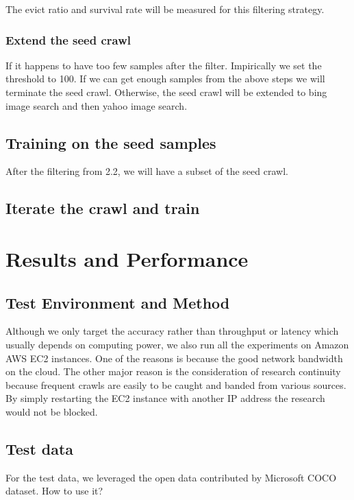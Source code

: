 \documentclass[paper=a4, fontsize=11pt]{scrartcl}
\numberwithin{equation}{section}		%
\numberwithin{figure}{section}			%
\numberwithin{table}{section}				%
\begin{document}
The evict ratio and survival rate will be measured for this filtering strategy.

\subsubsection{Extend the seed crawl}

If it happens to have too few samples after the filter. Impirically we set the threshold to 100. If we can get enough samples from the above steps we will terminate the seed crawl.
Otherwise, the seed crawl will be extended to bing image search and then yahoo image search.

\subsection{Training on the seed samples}
After the filtering from 2.2, we will have a subset of the seed crawl.

\subsection{Iterate the crawl and train}

\section{Results and Performance}

\subsection{Test Environment and Method}
Although we only target the accuracy rather than throughput or latency which usually depends on computing power, we also run all the experiments on Amazon AWS EC2 instances. One of the reasons is because the good network bandwidth on the cloud. The other major reason is the consideration of research continuity because frequent crawls are easily to be caught and banded from various sources. By simply restarting the EC2 instance with another IP address the research would not be blocked. 

\subsection{Test data}
For the test data, we leveraged the open data contributed by Microsoft COCO dataset. How to use it?
\end{document}
